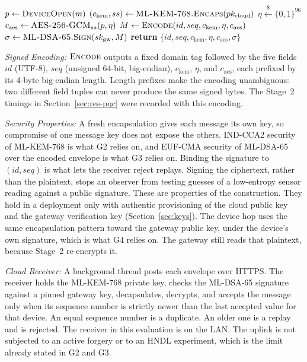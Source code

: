 \documentclass[journal]{IEEEtran}
\begin{document}
\begin{algorithm}[!t]
\caption{Stage 2 Re-Encryption of a Message $m$ Received by Stage 2}
\label{alg:reenc}
\begin{algorithmic}[1]
\State $p \gets \textsc{DeviceOpen}(m)$ 
\State $(c_\mathrm{kem}, ss) \gets \textsc{ML-KEM-768.Encaps}(pk_\mathrm{cloud})$
\State $\eta \xleftarrow{\$} \{0,1\}^{96}$
\State $c_\mathrm{aes} \gets \textsc{AES-256-GCM}_{ss}(p, \eta)$
\State $M \gets \textsc{Encode}(id, seq, c_\mathrm{kem}, \eta, c_\mathrm{aes})$
\State $\sigma \gets \textsc{ML-DSA-65.Sign}(sk_\mathrm{gw}, M)$
\State \textbf{return} $\{id, seq, c_\mathrm{kem}, \eta, c_\mathrm{aes}, \sigma\}$ 
\end{algorithmic}
\end{algorithm}

\textit{Signed Encoding:} $\textsc{Encode}$ outputs a fixed domain tag followed by the five fields $id$ (UTF-8), $seq$ (unsigned 64-bit, big-endian), $c_\mathrm{kem}$, $\eta$, and $c_\mathrm{aes}$, each prefixed by its 4-byte big-endian length. Length prefixes make the encoding unambiguous: two different field tuples can never produce the same signed bytes. The Stage~2 timings in Section~\ref{sec:res-pqc} were recorded with this encoding.

\textit{Security Properties:} A fresh encapsulation gives each message its own key, so compromise of one message key does not expose the others. IND-CCA2 security of ML-KEM-768 is what G2 relies on, and EUF-CMA security of ML-DSA-65 over the encoded envelope is what G3 relies on. Binding the signature to $(id, seq)$ is what lets the receiver reject replays. Signing the ciphertext, rather than the plaintext, stops an observer from testing guesses of a low-entropy sensor reading against a public signature. These are properties of the construction. They hold in a deployment only with authentic provisioning of the cloud public key and the gateway verification key (Section~\ref{sec:keys}). The device hop uses the same encapsulation pattern toward the gateway public key, under the device's own signature, which is what G4 relies on. The gateway still reads that plaintext, because Stage~2 re-encrypts it.

\textit{Cloud Receiver:} A background thread posts each envelope over HTTPS. The receiver holds the ML-KEM-768 private key, checks the ML-DSA-65 signature against a pinned gateway key, decapsulates, decrypts, and accepts the message only when its sequence number is strictly newer than the last accepted value for that device. An equal sequence number is a duplicate. An older one is a replay and is rejected. The receiver in this evaluation is on the LAN. The uplink is not subjected to an active forgery or to an HNDL experiment, which is the limit already stated in G2 and G3.
\end{document}
